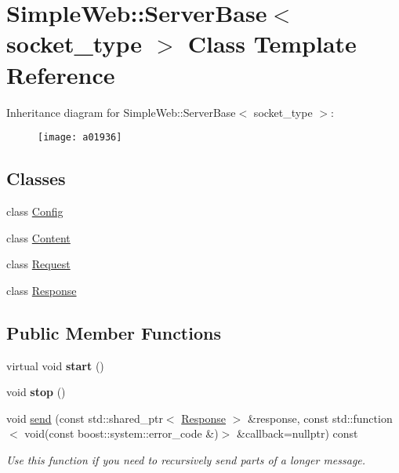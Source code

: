 \hypertarget{a01936}{}\section{Simple\+Web\+:\+:Server\+Base$<$ socket\+\_\+type $>$ Class Template Reference}
\label{a01936}
Inheritance diagram for Simple\+Web\+:\+:Server\+Base$<$ socket\+\_\+type $>$\+:\begin{figure}[H]
\begin{center}
\leavevmode
\texttt{[image: a01936]}
\end{center}
\end{figure}
\subsection*{Classes}
\begin{DoxyCompactItemize}
\item 
class \hyperlink{a01952}{Config}
\item 
class \hyperlink{a01944}{Content}
\item 
class \hyperlink{a01948}{Request}
\item 
class \hyperlink{a01940}{Response}
\end{DoxyCompactItemize}
\subsection*{Public Member Functions}
\begin{DoxyCompactItemize}
\item 
\mbox{\label{a01936_a759d6dae5fa77c47a36f7355fd33f8f7}} 
virtual void {\bfseries start} ()
\item 
\mbox{\label{a01936_a0667e44595f6c23016bee67c646ccc85}} 
void {\bfseries stop} ()
\item 
\mbox{\label{a01936_a93fd842b1a02dd63716ff0718f6069ce}} 
void \hyperlink{a01936_a93fd842b1a02dd63716ff0718f6069ce}{send} (const std\+::shared\+\_\+ptr$<$ \hyperlink{a01940}{Response} $>$ \&response, const std\+::function$<$ void(const boost\+::system\+::error\+\_\+code \&)$>$ \&callback=nullptr) const
\begin{DoxyCompactList}\small\item\em Use this function if you need to recursively send parts of a longer message. \end{DoxyCompactList}\end{DoxyCompactItemize}

